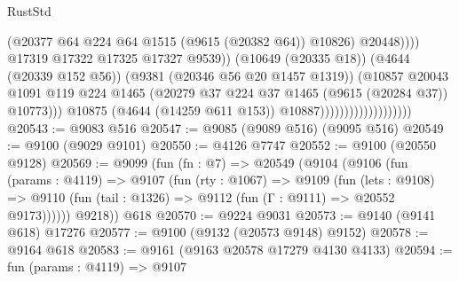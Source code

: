 \begin{lexlean}{RustStd}
\begin{coremodule}
                                                        (@20377
                                                          @64
                                                          @224
                                                          @64
                                                          @1515
                                                          (@9615 (@20382 @64))
                                                          @10826)
                                                        @20448))))
                                                @17319
                                                @17322
                                                @17325
                                                @17327
                                                @9539))
                                            (@10649 (@20335 @18))
                                            (@4644 (@20339 @152 @56))
                                            (@9381 (@20346 @56 @20 @1457 @1319))
                                            (@10857
                                              @20043
                                              @1091
                                              @119
                                              @224
                                              @1465
                                              (@20279
                                                @37
                                                @224
                                                @37
                                                @1465
                                                (@9615 (@20284 @37))
                                                @10773)))
                                          @10875
                                          (@4644 (@14259 @611 @153))
                                          @10887)))))))))))))))))))
@20543 := @9083 @516
@20547 := @9085 (@9089 @516) (@9095 @516)
@20549 := @9100 (@9029 @9101)
@20550 := @4126 @7747
@20552 := @9100 (@20550 @9128)
@20569 := @9099
    (fun (fn : @7) =>
    @20549
      (@9104
        (@9106
          (fun (params : @4119) =>
          @9107
            (fun (rty : @1067) =>
            @9109
              (fun (lets : @9108) =>
              @9110 (fun (tail : @1326) => @9112 (fun (Γ : @9111) => @20552 @9173))))))
        @9218))
    @618
@20570 := @9224 @9031
@20573 := @9140 (@9141 @618) @17276
@20577 := @9100 (@9132 (@20573 @9148) @9152)
@20578 := @9164 @618
@20583 := @9161 (@9163 @20578 @17279 @4130 @4133)
@20594 := fun (params : @4119) =>
  @9107

\end{coremodule}
\end{lexlean}
